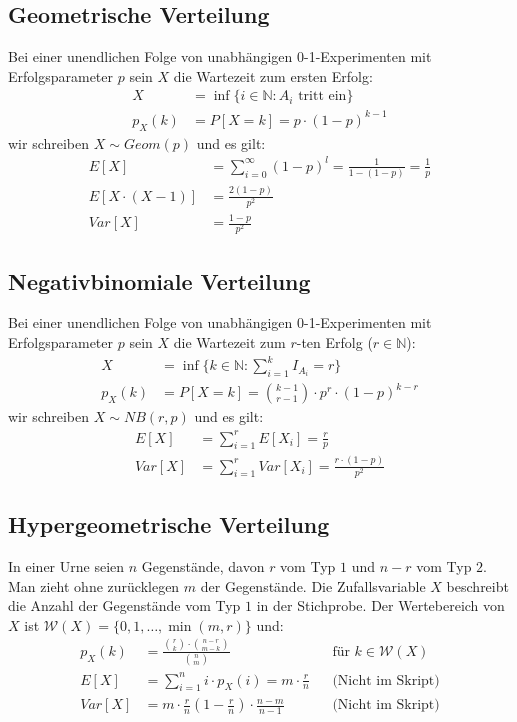 \documentclass[8pt]{extarticle}
\newcommand{\N}{\mathbb{N}}
\newcommand{\W}{\mathcal{W}}
\newcommand{\Sn}{\sum_{i = 1}^n}
\begin{document}
\begin{multicols*}{3}
  \subsection*{Geometrische Verteilung}
  Bei einer unendlichen Folge von unabhängigen 0-1-Experimenten
  mit Erfolgsparameter $p$ sein $X$ die Wartezeit zum ersten Erfolg:
  \begin{align*}
    X      & = \inf \{ i \in \N : A_i \text{ tritt ein} \} \\
    p_X(k) & = P[X = k] = p \cdot (1-p)^{k-1}
  \end{align*}
  wir schreiben $X \sim Geom(p)$ und es gilt:
  \begin{align*}
    E[X]             & = \sum_{i = 0}^\infty (1-p)^l
    = \frac{1}{1-(1-p)} = \frac{1}{p}                \\
    E[X \cdot (X-1)] & = \frac{2(1-p)}{p^2}          \\
    Var[X]           & = \frac{1-p}{p^2}
  \end{align*}
  \subsection*{Negativbinomiale Verteilung}
  Bei einer unendlichen Folge von unabhängigen 0-1-Experimenten
  mit Erfolgsparameter $p$ sein $X$ die Wartezeit zum $r$-ten Erfolg
  ($r \in \N$):
  \begin{align*}
    X      & = \inf \{ k \in \N : \sum_{i = 1}^k I_{A_i} = r \}        \\
    p_X(k) & = P[X = k] = \binom{k-1}{r-1} \cdot p^r \cdot (1-p)^{k-r}
  \end{align*}
  wir schreiben $X \sim NB(r, p)$ und es gilt:
  \begin{align*}
    E[X]   & = \sum_{i = 1}^r E[X_i] = \frac{r}{p}                 \\
    Var[X] & = \sum_{i = 1}^r Var[X_i] = \frac{r \cdot (1-p)}{p^2}
  \end{align*}
  \subsection*{Hypergeometrische Verteilung}
  In einer Urne seien $n$ Gegenstände, davon $r$ vom Typ $1$ und $n-r$
  vom Typ $2$. Man zieht ohne zurücklegen $m$ der Gegenstände.
  Die Zufallsvariable $X$ beschreibt die Anzahl der Gegenstände vom
  Typ $1$ in der Stichprobe. Der Wertebereich von $X$ ist
  $\W(X) = \{0, 1, \dots, \min(m, r)\}$ und:
  \begin{align*}
    p_X(k) & = \frac{\binom{r}{k} \cdot \binom{n-r}{m-k}}{\binom{n}{m}}
           &                                                                                & \text{für } k \in \W(X)                            \\
    E[X]   & = \Sn i \cdot p_X(i) = m \cdot \frac{r}{n}                                     &                         & \text{(Nicht im Skript)} \\
    Var[X] & = m \cdot \frac{r}{n} \left (1 - \frac{r}{n} \right) \cdot \frac{n - m}{n - 1} &                         & \text{(Nicht im Skript)}
  \end{align*}

\end{multicols*}
\end{document}
